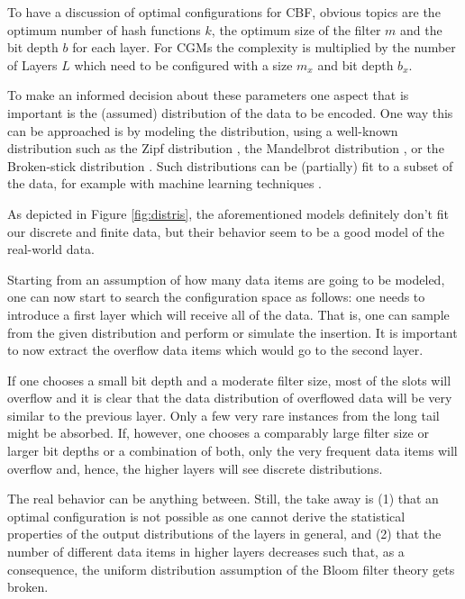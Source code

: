 \documentclass[sigconf]{acmart}
\begin{document}
To have a discussion of optimal configurations for CBF, obvious topics are the optimum number of hash functions $k$, the optimum size of the filter $m$ and the bit depth $b$ for each layer. For CGMs the complexity is multiplied by the number of Layers $L$ which need to be configured with a size $m_x$ and bit depth $b_x$.

To make an informed decision about these parameters one aspect that is important is the (assumed) distribution of the data to be encoded. One way this can be approached is by modeling the distribution, using a well-known distribution such as the Zipf distribution \cite{zipf1945meaning}, the Mandelbrot distribution \cite{mandelbrot1967distribution}, or the Broken-stick distribution \cite{baumiller1992broken}. Such distributions can be (partially) fit to a subset of the data, for example with machine learning techniques \cite{pradoml}.

As depicted in Figure \ref{fig:distris}, the aforementioned models definitely don't fit our discrete and finite data, but their behavior seem to be a good model of the real-world data.

Starting from an assumption of how many data items are going to be modeled, one can now start to search the configuration space as follows: one needs to introduce a first layer which will receive all of the data. That is, one can sample from the given distribution and perform or simulate the insertion. It is important to now extract the overflow data items which would go to the second layer.

If one chooses a small bit depth and a moderate filter size, most of the slots will overflow and it is clear that the data distribution of overflowed data will be very similar to the previous layer. Only a few very rare instances from the long tail might be absorbed.
If, however, one chooses a comparably large filter size or larger bit depths or a combination of both, only the very frequent data items will overflow and, hence, the higher layers will see discrete distributions.

The real behavior can be anything between. Still, the take away is (1) that an optimal configuration is not possible as one cannot derive the statistical properties of the output distributions of the layers in general, and (2) that the number of different data items in higher layers decreases such that, as a consequence, the uniform distribution assumption of the Bloom filter theory gets broken.


\end{document}

